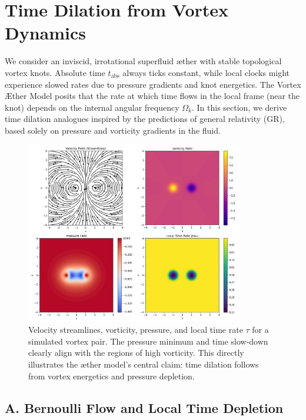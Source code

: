 \section{Time Dilation from Vortex Dynamics}\label{sec:Part-1}

    We consider an inviscid, irrotational superfluid æther with stable topological vortex knots. Absolute time $t_{\text{abs}}$ always ticks constant, while local clocks might experience slowed rates due to pressure gradients and knot energetics. The Vortex Æther Model posits that the rate at which time flows in the local frame (near the knot) depends on the internal angular frequency $\Omega_k$. In this section, we derive time dilation analogues inspired by the predictions of general relativity (GR), based solely on pressure and vorticity gradients in the fluid.

\begin{figure}[h!]
    \centering
    \includegraphics[width=0.85\textwidth]{export/streamlinesDiPole}
    \caption{Velocity streamlines, vorticity, pressure, and local time rate $\tau$ for a simulated vortex pair. The pressure minimum and time slow-down clearly align with the regions of high vorticity. This directly illustrates the æther model's central claim: time dilation follows from vortex energetics and pressure depletion.}
    \label{fig:vortexfields}
\end{figure}

\subsection*{A. Bernoulli Flow and Local Time Depletion}

